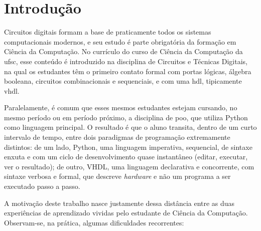 \chapter{Introdução}
\label{cap:introducao}

Circuitos digitais formam a base de praticamente todos os sistemas computacionais modernos, e seu estudo é parte obrigatória da formação em Ciência da Computação. No currículo do curso de Ciência da Computação da \gls{ufsc}, esse conteúdo é introduzido na disciplina de Circuitos e Técnicas Digitais, na qual os estudantes têm o primeiro contato formal com portas lógicas, álgebra booleana, circuitos combinacionais e sequenciais, e com uma \gls{hdl}, tipicamente \gls{vhdl}.

Paralelamente, é comum que esses mesmos estudantes estejam cursando, no mesmo período ou em período próximo, a disciplina de \gls{poo}, que utiliza Python como linguagem principal. O resultado é que o aluno transita, dentro de um curto intervalo de tempo, entre dois paradigmas de programação extremamente distintos: de um lado, Python, uma linguagem imperativa, sequencial, de sintaxe enxuta e com um ciclo de desenvolvimento quase instantâneo (editar, executar, ver o resultado); de outro, VHDL, uma linguagem declarativa e concorrente, com sintaxe verbosa e formal, que descreve \textit{hardware} e não um programa a ser executado passo a passo.

A motivação deste trabalho nasce justamente dessa distância entre as duas experiências de aprendizado vividas pelo estudante de Ciência da Computação. Observam-se, na prática, algumas dificuldades recorrentes:

